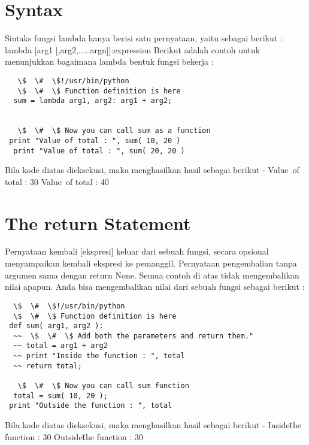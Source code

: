 \section{Syntax} 
Sintaks fungsi lambda hanya berisi satu pernyataan, yaitu sebagai berikut : 
  lambda [arg1 [,arg2,.....argn]]:expression 
Berikut adalah contoh untuk menunjukkan bagaimana lambda bentuk fungsi bekerja :
\begin{verbatim}
   \$  \#  \$!/usr/bin/python 
   \$  \#  \$ Function definition is here 
  sum = lambda arg1, arg2: arg1 + arg2;


   \$  \#  \$ Now you can call sum as a function 
 print "Value of total : ", sum( 10, 20 ) 
  print "Value of total : ", sum( 20, 20 ) 
  \end{verbatim}
Bila kode diatas dieksekusi, maka menghasilkan hasil sebagai berikut - 
 Value~of total :  30 
 Value~of total :  40 
\section{The return Statement} 
Pernyataan kembali [ekspresi] keluar dari sebuah fungsi, secara opsional menyampaikan kembali ekspresi ke pemanggil. Pernyataan pengembalian tanpa argumen sama dengan return None. 
Semua contoh di atas tidak mengembalikan nilai apapun. Anda bisa mengembalikan nilai dari sebuah fungsi sebagai berikut :
\begin{verbatim}
  \$  \#  \$!/usr/bin/python 
  \$  \#  \$ Function definition is here 
 def sum( arg1, arg2 ): 
  ~~  \$  \#  \$ Add both the parameters and return them." 
  ~~ total = arg1 + arg2 
  ~~ print "Inside the function : ", total 
  ~~ return total; 
 
   \$  \#  \$ Now you can call sum function 
  total = sum( 10, 20 ); 
 print "Outside the function : ", total  
 \end{verbatim}
Bila kode diatas dieksekusi, maka menghasilkan hasil sebagai berikut -
  Inside\~the function :  30 
 Outside\~the function :  30 
